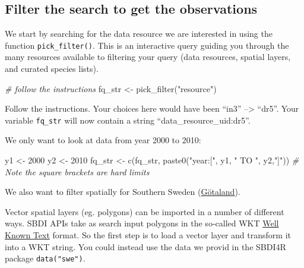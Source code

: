 \documentclass[
  10pt,
]{article}
\newenvironment{Shaded}{\begin{snugshade}}{\end{snugshade}}
\newcommand{\CommentTok}[1]{\textcolor[rgb]{0.56,0.35,0.01}{\textit{#1}}}
\newcommand{\DecValTok}[1]{\textcolor[rgb]{0.00,0.00,0.81}{#1}}
\newcommand{\FunctionTok}[1]{\textcolor[rgb]{0.00,0.00,0.00}{#1}}
\newcommand{\NormalTok}[1]{#1}
\newcommand{\OtherTok}[1]{\textcolor[rgb]{0.56,0.35,0.01}{#1}}
\newcommand{\StringTok}[1]{\textcolor[rgb]{0.31,0.60,0.02}{#1}}
\begin{document}
\hypertarget{filter-the-search-to-get-the-observations}{%
\subsection{Filter the search to get the observations}\label{filter-the-search-to-get-the-observations}}

We start by searching for the data resource we are interested in using
the function \texttt{pick\_filter()}. This is an interactive query guiding you
through the many resources available to filtering your query (data
resources, spatial layers, and curated species lists).

\begin{Shaded}
\begin{Highlighting}[]
\CommentTok{\# follow the instructions }
\NormalTok{fq\_str }\OtherTok{\textless{}{-}} \FunctionTok{pick\_filter}\NormalTok{(}\StringTok{"resource"}\NormalTok{) }
\end{Highlighting}
\end{Shaded}

Follow the instructions. Your choices here would have been ``in3'' --\textgreater{}
``dr5''. Your variable \texttt{fq\_str} will now contain a string
``data\_resource\_uid:dr5''.

We only want to look at data from year 2000 to 2010:

\begin{Shaded}
\begin{Highlighting}[]
\NormalTok{y1 }\OtherTok{\textless{}{-}} \DecValTok{2000}
\NormalTok{y2 }\OtherTok{\textless{}{-}} \DecValTok{2010}
\NormalTok{fq\_str }\OtherTok{\textless{}{-}} \FunctionTok{c}\NormalTok{(fq\_str, }\FunctionTok{paste0}\NormalTok{(}\StringTok{"year:["}\NormalTok{, y1, }\StringTok{" TO "}\NormalTok{, y2,}\StringTok{"]"}\NormalTok{))}
\CommentTok{\# Note the square brackets are hard limits}
\end{Highlighting}
\end{Shaded}

We also want to filter spatially for Southern Sweden
(\href{https://en.wikipedia.org/wiki/G\%C3\%B6taland}{Götaland}).

Vector spatial layers (eg. polygons) can be imported in a number of
different ways. SBDI APIs take as search input polygons in the so-called
WKT \href{https://www.geoapi.org/3.0/javadoc/org/opengis/referencing/doc-files/WKT.html}{Well Known
Text}
format. So the first step is to load a vector layer and transform it
into a WKT string. You could instead use the data we provid in the
SBDI4R package \texttt{data("swe")}.
\end{document}
